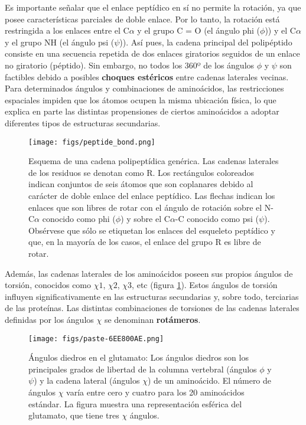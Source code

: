 Es importante señalar que el enlace peptídico en sí no permite la rotación, ya que posee características parciales de doble enlace. Por lo tanto, la rotación está restringida a los enlaces entre el C$\alpha$ y el grupo C = O (el ángulo phi ($\phi$)) y el C$\alpha$ y el grupo NH (el ángulo psi ($\psi$)). Así pues, la cadena principal del polipéptido consiste en una secuencia repetida de dos enlaces giratorios seguidos de un enlace no giratorio (péptido). Sin embargo, no todos los 360º de los ángulos $\phi$ y $\psi$ son factibles debido a posibles \textbf{choques estéricos} entre cadenas laterales vecinas. Para determinados ángulos y combinaciones de aminoácidos, las restricciones espaciales impiden que los átomos ocupen la misma ubicación física, lo que explica en parte las distintas propensiones de ciertos aminoácidos a adoptar diferentes tipos de estructuras secundarias. 

\begin{figure}[h]
\centering
\texttt{[image: figs/peptide\_bond.png]}
\caption{Esquema de una cadena polipeptídica genérica. Las cadenas laterales de los residuos se denotan como R. Los rectángulos coloreados indican conjuntos de seis átomos que son coplanares debido al carácter de doble enlace del enlace peptídico. Las flechas indican los enlaces que son libres de rotar con el ángulo de rotación sobre el N-C$\alpha$ conocido como phi ($\phi$) y sobre el C$\alpha$-C conocido como psi ($\psi$). Obsérvese que sólo se etiquetan los enlaces del esqueleto peptídico y que, en la mayoría de los casos, el enlace del grupo R es libre de rotar.}
\end{figure}

Además, las cadenas laterales de los aminoácidos poseen sus propios ángulos de torsión, conocidos como $\chi1$, $\chi2$, $\chi3$, etc (figura \ref{fig:chi}). Estos ángulos de torsión influyen significativamente en las estructuras secundarias y, sobre todo, terciarias de las proteínas. Las distintas combinaciones de torsiones de las cadenas laterales definidas por los ángulos $\chi$ se denominan \textbf{rotámeros}.

\begin{figure}[h]
\centering
\texttt{[image: figs/paste-6EE800AE.png]}
\caption{Ángulos diedros en el glutamato: Los ángulos diedros son los principales grados de libertad de la columna vertebral (ángulos $\phi$ y $\psi$) y la cadena lateral (ángulos $\chi$) de un aminoácido. El número de ángulos $\chi$ varía entre cero y cuatro para los 20 aminoácidos estándar. La figura muestra una representación esférica del glutamato, que tiene tres $\chi$ ángulos.}
\label{fig:chi}
\end{figure}

